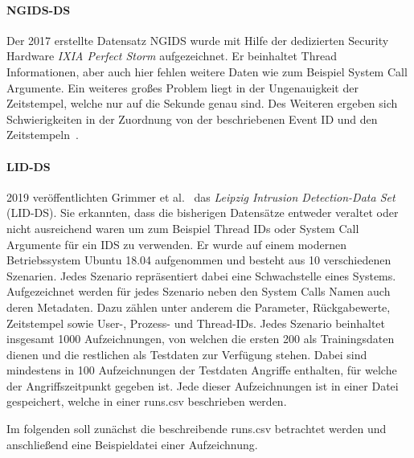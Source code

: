         \paragraph{NGIDS-DS}
            Der 2017 erstellte Datensatz NGIDS \cite{NGIDS} wurde mit Hilfe der dedizierten Security Hardware \textit{IXIA Perfect Storm} aufgezeichnet.
            Er beinhaltet Thread Informationen, aber auch hier fehlen weitere Daten wie zum Beispiel System Call Argumente.
            Ein weiteres großes Problem liegt in der Ungenauigkeit der Zeitstempel, welche nur auf die Sekunde genau sind.
            Des Weiteren ergeben sich Schwierigkeiten in der Zuordnung von der beschriebenen Event ID und den Zeitstempeln~\cite{Grimmer}.
        \paragraph{LID-DS}
            2019 veröffentlichten Grimmer et al.~\cite{LIDDS} das \textit{Leipzig Intrusion Detection-Data Set} (LID-DS).
            Sie erkannten, dass die bisherigen Datensätze entweder veraltet oder nicht ausreichend waren um zum Beispiel Thread IDs oder System Call Argumente für ein IDS zu verwenden.
            Er wurde auf einem modernen Betriebssystem Ubuntu 18.04 aufgenommen und besteht aus 10 verschiedenen Szenarien.
            Jedes Szenario repräsentiert dabei eine Schwachstelle eines Systems. Aufgezeichnet werden für jedes Szenario neben den System Calls Namen auch deren Metadaten.
            Dazu zählen unter anderem die Parameter, Rückgabewerte, Zeitstempel sowie User-, Prozess- und Thread-IDs.
            Jedes Szenario beinhaltet insgesamt 1000 Aufzeichnungen, von welchen die ersten 200 als Trainingsdaten dienen 
            und die restlichen als Testdaten zur Verfügung stehen. 
            Dabei sind mindestens in 100 Aufzeichnungen der Testdaten Angriffe enthalten, für welche der Angriffszeitpunkt gegeben ist.
            Jede dieser Aufzeichnungen ist in einer Datei gespeichert, welche in einer runs.csv beschrieben werden.
             
            Im folgenden soll zunächst die beschreibende runs.csv betrachtet werden und anschließend eine Beispieldatei einer Aufzeichnung.

